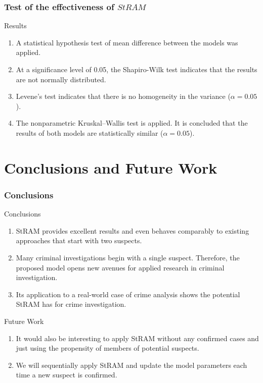 \documentclass[aspectratio=169]{beamer}
\begin{document}
\begin{frame}
\frametitle{Test of the effectiveness of $StRAM$}
\begin{block}{Results}
  \footnotesize
  \begin{enumerate}
    \item A statistical hypothesis test of mean difference between the models was applied.
    \item At a significance level of 0.05, the Shapiro-Wilk test indicates that the results are not normally distributed.
    \item Levene's test indicates that there is no homogeneity in the variance ($\alpha = 0.05$).
    \item The nonparametric Kruskal–Wallis test is applied. It is concluded that the results of both models are statistically similar ($\alpha = 0.05$).
  \end{enumerate}
\end{block}
\vfill

\end{frame}

\section[Conclusions and Future Work]{Conclusions and Future Work}
\begin{frame}
\frametitle{Conclusions}
  \begin{block}{Conclusions}
    \begin{enumerate}
      \item StRAM provides excellent results and even behaves comparably to existing approaches that start with two suspects.
      \item Many criminal investigations begin with a single suspect. Therefore, the proposed model opens new avenues for applied research in criminal investigation.
      \item Its application to a real-world case of crime analysis shows the potential StRAM has for crime investigation.
    \end{enumerate}
  \end{block}
  \begin{block}{Future Work}
    \begin{enumerate}
      \item It would also be interesting to apply StRAM without any confirmed cases and just using the propensity of members of potential suspects.
      \item We will sequentially apply StRAM and update the model parameters each time a new suspect is confirmed.
    \end{enumerate}
  \end{block}
\end{frame}
\end{document}
